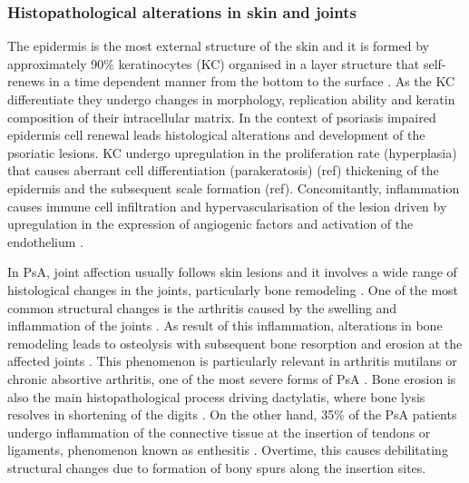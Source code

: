 

\subsubsection*{Histopathological alterations in skin and joints}

The epidermis is the most external structure of the skin and it is formed by approximately 90\% keratinocytes (KC) organised in a layer structure that self-renews in a time dependent manner from the bottom to the surface \parencite{Wikramanayake2014}. As the KC differentiate they undergo changes in morphology, replication ability and keratin composition of their intracellular matrix. In the context of psoriasis impaired epidermis cell renewal leads histological alterations and development of the psoriatic lesions. KC undergo upregulation in the proliferation rate (hyperplasia) that causes aberrant cell differentiation (parakeratosis) (ref) thickening of the epidermis and the subsequent scale formation (ref). Concomitantly, inflammation causes immune cell infiltration and hypervascularisation of the lesion driven by upregulation in the expression of angiogenic factors and activation of the endothelium \parencite{Perera2012}. 

In PsA, joint affection usually follows skin lesions and it involves a wide range of histological changes in the joints, particularly bone remodeling \parencite{Haddad2013}. One of the most common structural changes is the arthritis caused by the swelling and inflammation of the joints \parencite{Schett2011}. As result of this inflammation, alterations in bone remodeling leads to osteolysis with subsequent bone resorption and erosion at the affected joints \parencite{Mensah2017}. This phenomenon is particularly relevant in arthritis mutilans or chronic absortive arthritis, one of the most severe forms of PsA \parencite{Haddad2013}. Bone erosion is also the main histopathological process driving dactylatis, where bone lysis resolves in shortening of the digits \parencite{Gladman2005}. On the other hand, 35\% of the PsA patients undergo inflammation of the connective tissue at the insertion of tendons or ligaments, phenomenon known as enthesitis \parencite{McGonagle2011,Polachek2017}. Overtime, this causes debilitating structural changes due to formation of bony spurs along the insertion sites\parencite{Schett2011}.


